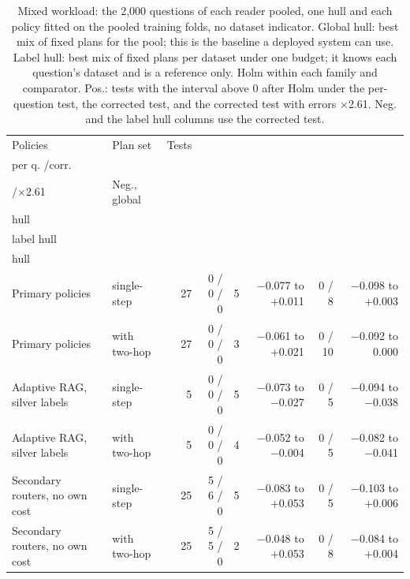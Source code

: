 \begin{table}[t]
\centering\small
\setlength{\tabcolsep}{4pt}
\caption{Mixed workload: the 2,000 questions of each reader pooled, one hull and each policy fitted on the pooled training folds, no dataset indicator. Global hull: best mix of fixed plans for the pool; this is the baseline a deployed system can use. Label hull: best mix of fixed plans per dataset under one budget; it knows each question's dataset and is a reference only. Holm within each family and comparator. Pos.: tests with the interval above 0 after Holm under the per-question test, the corrected test, and the corrected test with errors $\times$2.61. Neg. and the label hull columns use the corrected test.}
\label{tab:rev2_mixed}
\begin{tabular*}{\linewidth}{@{\extracolsep{\fill}}llrrrrrr}
\toprule
Policies & Plan set & Tests & \begin{tabular}[b]{@{}r@{}}Pos., global: \\ per q. /corr. \\ /$\times$2.61\end{tabular} & Neg., global & \begin{tabular}[b]{@{}r@{}}Gain, global \\ hull\end{tabular} & \begin{tabular}[b]{@{}r@{}}Pos./neg., \\ label hull\end{tabular} & \begin{tabular}[b]{@{}r@{}}Gain, label \\ hull\end{tabular} \\
\midrule
Primary policies & single-step & 27 & 0 / 0 / 0 & 5 & $-$0.077 to +0.011 & 0 / 8 & $-$0.098 to +0.003 \\
Primary policies & with two-hop & 27 & 0 / 0 / 0 & 3 & $-$0.061 to +0.021 & 0 / 10 & $-$0.092 to 0.000 \\
Adaptive RAG, silver labels & single-step & 5 & 0 / 0 / 0 & 5 & $-$0.073 to $-$0.027 & 0 / 5 & $-$0.094 to $-$0.038 \\
Adaptive RAG, silver labels & with two-hop & 5 & 0 / 0 / 0 & 4 & $-$0.052 to $-$0.004 & 0 / 5 & $-$0.082 to $-$0.041 \\
Secondary routers, no own cost & single-step & 25 & 5 / 6 / 0 & 5 & $-$0.083 to +0.053 & 0 / 5 & $-$0.103 to +0.006 \\
Secondary routers, no own cost & with two-hop & 25 & 5 / 5 / 0 & 2 & $-$0.048 to +0.053 & 0 / 8 & $-$0.084 to +0.004 \\

\end{tabular*}
\end{table}
